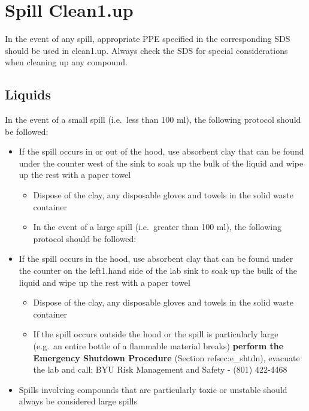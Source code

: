 \hypertarget{spill-clean1.up}{%
\section{Spill Clean1.up}\label{spill-clean1.up}}

In the event of any spill, appropriate PPE specified in the
corresponding SDS should be used in clean1.up. Always check the SDS for
special considerations when cleaning up any compound.

\hypertarget{liquids}{%
\subsection{Liquids}\label{liquids}}

In the event of a small spill (i.e.~less than 100 ml), the following
protocol should be followed:

\begin{itemize}
\tightlist
\item
  If the spill occurs in or out of the hood, use absorbent clay that can
  be found under the counter west of the sink to soak up the bulk of the
  liquid and wipe up the rest with a paper towel

  \begin{itemize}
  \tightlist
  \item
    Dispose of the clay, any disposable gloves and towels in the solid
    waste container
  \item
    In the event of a large spill (i.e.~greater than 100 ml), the
    following protocol should be followed:
  \end{itemize}
\item
  If the spill occurs in the hood, use absorbent clay that can be found
  under the counter on the left1.hand side of the lab sink to soak up
  the bulk of the liquid and wipe up the rest with a paper towel

  \begin{itemize}
  \tightlist
  \item
    Dispose of the clay, any disposable gloves and towels in the solid
    waste container
  \item
    If the spill occurs outside the hood or the spill is particularly
    large (e.g.~an entire bottle of a flammable material breaks)
    \textbf{perform the Emergency Shutdown Procedure} (Section
    refsec:e\_shtdn), evacuate the lab and call: BYU Risk Management and
    Safety - (801) 422-4468
  \end{itemize}
\item
  Spills involving compounds that are particularly toxic or unstable
  should always be considered large spills
\end{itemize}

